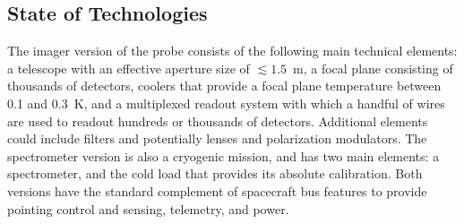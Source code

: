 
\subsection{State of Technologies}
\label{sec:technologies}

\vspace{-0.05in}

The imager version of the probe consists of the following main technical elements: a telescope with an effective aperture size 
of $\lesssim1.5$~m, a focal plane consisting of thousands of detectors, coolers that provide a focal plane temperature between 0.1 and 0.3~K, 
and a multiplexed readout system with which a handful of wires are used to readout hundreds or thousands of detectors. Additional 
elements could include filters and potentially lenses and polarization modulators. 
The spectrometer version is also a cryogenic mission, and has two main elements: a spectrometer, and the cold load 
that provides its absolute calibration. Both versions have the standard complement of spacecraft bus features 
to provide pointing control and sensing, telemetry, and power. 

